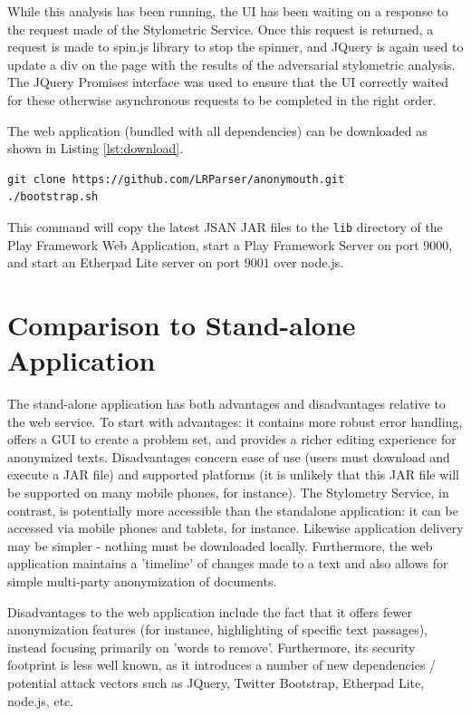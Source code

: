 \documentclass[letterpaper]{article}
\begin{document}
While this analysis has been running, the UI has been waiting on a
response to the request made of the Stylometric Service. Once this
request is returned, a request is made to spin.js library to stop the
spinner, and JQuery is again used to update a div on the page with the
results of the adversarial stylometric analysis. The JQuery Promises
interface was used to ensure that the UI correctly waited for these
otherwise asynchronous requests to be completed in the right order.

The web application (bundled with all dependencies) can be downloaded
as shown in Listing \ref{lst:download}.

\begin{lstlisting}[caption={Download Web Application},label={lst:download}]
git clone https://github.com/LRParser/anonymouth.git
./bootstrap.sh
\end{lstlisting}

This command will copy the latest JSAN JAR files to the \texttt{lib}
directory of the Play Framework Web Application, start a Play
Framework Server on port $9000$, and start an Etherpad Lite server on
port $9001$ over node.js.

\section{Comparison to Stand-alone Application}

The stand-alone application has both advantages and disadvantages
relative to the web service. To start with advantages: it contains
more robust error handling, offers a GUI to create a problem set, and
provides a richer editing experience for anonymized
texts. Disadvantages concern ease of use (users must download and
execute a JAR file) and supported platforms (it is unlikely that this
JAR file will be supported on many mobile phones, for instance). The
Stylometry Service, in contrast, is potentially more accessible than
the standalone application: it can be accessed via mobile phones and
tablets, for instance. Likewise application delivery may be simpler -
nothing must be downloaded locally. Furthermore, the web application
maintains a 'timeline' of changes made to a text and also allows for
simple multi-party anonymization of documents.

Disadvantages to the web application include the fact that it offers
fewer anonymization features (for instance, highlighting of specific
text passages), instead focusing primarily on 'words to
remove'. Furthermore, its security footprint is less well known, as it
introduces a number of new dependencies / potential attack vectors
such as JQuery, Twitter Bootstrap, Etherpad Lite, node.js, etc.
\end{document}
